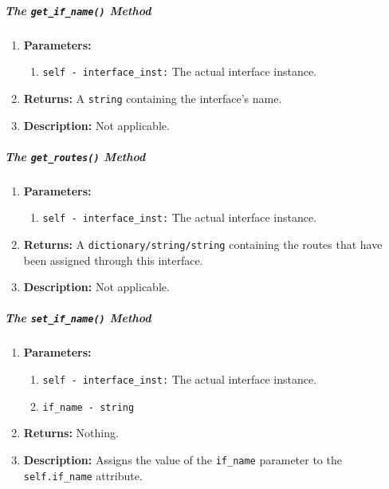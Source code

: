                     \subparagraph{The \texttt{get\_if\_name()} Method}
                        \begin{enumerate}
                            \item \textbf{Parameters:}
                            \begin{enumerate}
                                \item \texttt{self - interface\_inst:} The actual interface instance.
                            \end{enumerate}
                            \item \textbf{Returns:} A \texttt{string} containing the interface's name.
                            \item \textbf{Description:} Not applicable.
                        \end{enumerate}

                    \subparagraph{The \texttt{get\_routes()} Method}
                        \begin{enumerate}
                            \item \textbf{Parameters:}
                            \begin{enumerate}
                                \item \texttt{self - interface\_inst:} The actual interface instance.
                            \end{enumerate}
                            \item \textbf{Returns:} A \texttt{dictionary/string/string} containing the routes that have been assigned through this interface.
                            \item \textbf{Description:} Not applicable.
                        \end{enumerate}

                    \subparagraph{The \texttt{set\_if\_name()} Method}
                        \begin{enumerate}
                            \item \textbf{Parameters:}
                            \begin{enumerate}
                                \item \texttt{self - interface\_inst:} The actual interface instance.
                                \item \texttt{if\_name - string}
                            \end{enumerate}
                            \item \textbf{Returns:} Nothing.
                            \item \textbf{Description:} Assigns the value of the \texttt{if\_name} parameter to the \texttt{self.if\_name} attribute.
                        \end{enumerate}

